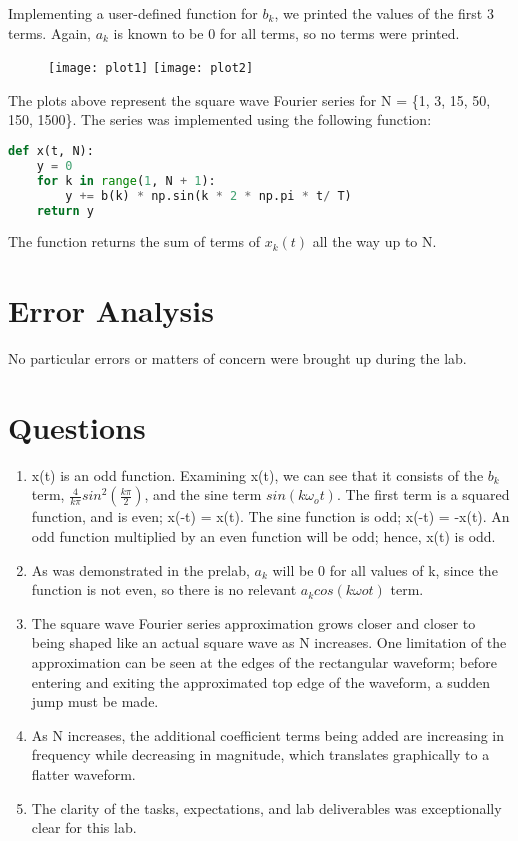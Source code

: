 \documentclass[11pt,a4,titlepage]{article}
\begin{document}
Implementing a user-defined function for $b_{k}$, we printed the values of the first 3 terms. Again, $a_{k}$ is known to be 0 for all terms, so no terms were printed.

\begin{figure}[H]
	\centering
	\texttt{[image: plot1]}
	\texttt{[image: plot2]}
\end{figure}

The plots above represent the square wave Fourier series for N = \{1, 3, 15, 50, 150, 1500\}. The series was implemented using the following function:

\begin{lstlisting}[language=Python]
def x(t, N):
	y = 0
	for k in range(1, N + 1):
		y += b(k) * np.sin(k * 2 * np.pi * t/ T)
	return y
\end{lstlisting}

The function returns the sum of terms of $x_{k}(t)$ all the way up to N.

\section{Error Analysis}
No particular errors or matters of concern were brought up during the lab.

\section{Questions}
\begin{enumerate}
	\item x(t) is an odd function. Examining x(t), we can see that it consists of the $b_{k}$ term, $\frac{4}{k\pi}sin^2(\frac{k\pi}{2})$, and the sine term $sin(k\omega_{o}t)$. The first term is a squared function, and is even; x(-t) = x(t). The sine function is odd; x(-t) = -x(t). An odd function multiplied by an even function will be odd; hence, x(t) is odd.
	\item As was demonstrated in the prelab, $a_{k}$ will be 0 for all values of k, since the function is not even, so there is no relevant $a_{k}cos(k\omega{o}t)$ term.
	\item The square wave Fourier series approximation grows closer and closer to being shaped like an actual square wave as N increases. One limitation of the approximation can be seen at the edges of the rectangular waveform; before entering and exiting the approximated top edge of the waveform, a sudden jump must be made.
	\item As N increases, the additional coefficient terms being added are increasing in frequency while decreasing in magnitude, which translates graphically to a flatter waveform.
	\item The clarity of the tasks, expectations, and lab deliverables was exceptionally clear for this lab.
\end{enumerate}
\end{document}
